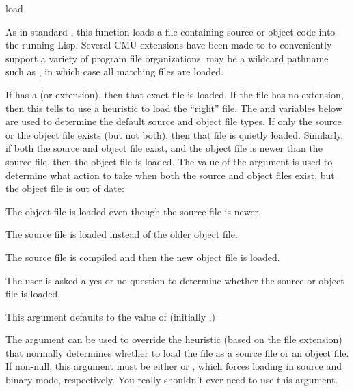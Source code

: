 \begin{defun}{}{load}{%
    }
  
  As in standard \clisp{}, this function loads a file containing
  source or object code into the running Lisp.  Several CMU extensions
  have been made to  to conveniently support a variety of
  program file organizations.   may be a wildcard
  pathname such as , in which case all matching files are
  loaded.
  
  If  has a  (or extension), then
  that exact file is loaded.  If the file has no extension, then this
  tells  to use a heuristic to load the ``right'' file.
  The  and 
  variables below are used to determine the default source and object
  file types.  If only the source or the object file exists (but not
  both), then that file is quietly loaded.  Similarly, if both the
  source and object file exist, and the object file is newer than the
  source file, then the object file is loaded.  The value of the
   argument is used to determine what action to
  take when both the source and object files exist, but the object
  file is out of date:
  \begin{Lentry}
  \item[\kwd{load-object}] The object file is loaded even though the
    source file is newer.
    
  \item[\kwd{load-source}] The source file is loaded instead of the
    older object file.
    
  \item[\kwd{compile}] The source file is compiled and then the new
    object file is loaded.
    
  \item[\kwd{query}] The user is asked a yes or no question to
    determine whether the source or object file is loaded.
  \end{Lentry}
  This argument defaults to the value of
   (initially .)
  
  The  argument can be used to override the heuristic
  (based on the file extension) that normally determines whether to
  load the file as a source file or an object file.  If non-null, this
  argument must be either  or , which forces
  loading in source and binary mode, respectively. You really
  shouldn't ever need to use this argument.
\end{defun}

